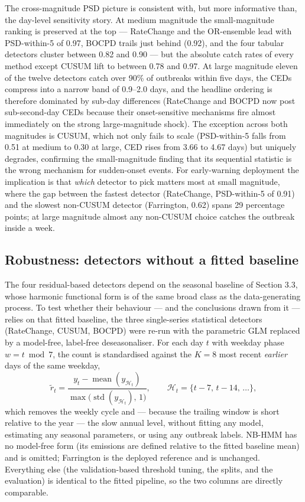 \documentclass[11pt]{article}
\begin{document}
The cross-magnitude PSD picture is consistent with, but more informative than, the day-level sensitivity story. At medium magnitude the small-magnitude ranking is preserved at the top --- RateChange and the OR-ensemble lead with PSD-within-5 of 0.97, BOCPD trails just behind (0.92), and the four tabular detectors cluster between 0.82 and 0.90 --- but the absolute catch rates of every method except CUSUM lift to between 0.78 and 0.97. At large magnitude eleven of the twelve detectors catch over 90\% of outbreaks within five days, the CEDs compress into a narrow band of 0.9--2.0 days, and the headline ordering is therefore dominated by sub-day differences (RateChange and BOCPD now post sub-second-day CEDs because their onset-sensitive mechanisms fire almost immediately on the strong large-magnitude shock). The exception across both magnitudes is CUSUM, which not only fails to scale (PSD-within-5 falls from 0.51 at medium to 0.30 at large, CED rises from 3.66 to 4.67 days) but uniquely degrades, confirming the small-magnitude finding that its sequential statistic is the wrong mechanism for sudden-onset events. For early-warning deployment the implication is that \textit{which} detector to pick matters most at small magnitude, where the gap between the fastest detector (RateChange, PSD-within-5 of 0.91) and the slowest non-CUSUM detector (Farrington, 0.62) spans 29 percentage points; at large magnitude almost any non-CUSUM choice catches the outbreak inside a week.

\subsection{Robustness: detectors without a fitted baseline}

The four residual-based detectors depend on the seasonal baseline of Section 3.3, whose harmonic functional form is of the same broad class as the data-generating process. To test whether their behaviour --- and the conclusions drawn from it --- relies on that fitted baseline, the three single-series statistical detectors (RateChange, CUSUM, BOCPD) were re-run with the parametric GLM replaced by a model-free, label-free deseasonaliser. For each day $t$ with weekday phase $w = t \bmod 7$, the count is standardised against the $K = 8$ most recent \textit{earlier} days of the same weekday,
\[
\tilde{r}_t = \frac{y_t - \operatorname{mean}(y_{\mathcal{H}_t})}{\max\!\big(\operatorname{std}(y_{\mathcal{H}_t}),\,1\big)},
\qquad \mathcal{H}_t = \{t-7,\, t-14,\, \dots\},
\]
which removes the weekly cycle and --- because the trailing window is short relative to the year --- the slow annual level, without fitting any model, estimating any seasonal parameters, or using any outbreak labels. NB-HMM has no model-free form (its emissions are defined relative to the fitted baseline mean) and is omitted; Farrington is the deployed reference and is unchanged. Everything else (the validation-based threshold tuning, the splits, and the evaluation) is identical to the fitted pipeline, so the two columns are directly comparable.
\end{document}
